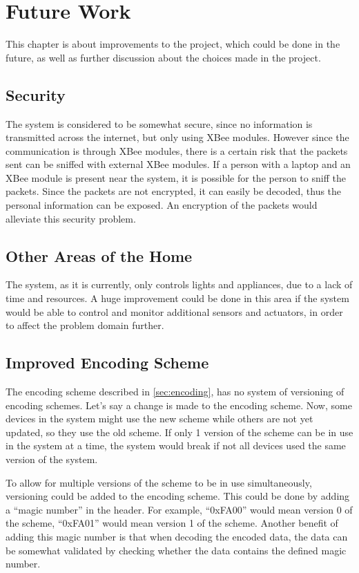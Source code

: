 \chapter{Future Work}
\label{chap:future_work}
This chapter is about improvements to the project, which could be done in the future, as well as further discussion about the choices made in the project.

\section{Security}
The system is considered to be somewhat secure, since no information is transmitted across the internet, but only using XBee modules. However since the communication is through XBee modules, there is a certain risk that the packets sent can be sniffed with external XBee modules. If a person with a laptop and an XBee module is present near the system, it is possible for the person to sniff the packets. Since the packets are not encrypted, it can easily be decoded, thus the personal information can be exposed. An encryption of the packets would alleviate this security problem.

\section{Other Areas of the Home}
The system, as it is currently, only controls lights and appliances, due to a lack of time and resources. A huge improvement could be done in this area if the system would be able to control and monitor additional sensors and actuators, in order to affect the problem domain further.

\section{Improved Encoding Scheme}
The encoding scheme described in \cref{sec:encoding}, has no system of versioning of encoding schemes. Let's say a change is made to the encoding scheme. Now, some devices in the system might use the new scheme while others are not yet updated, so they use the old scheme. If only 1 version of the scheme can be in use in the system at a time, the system would break if not all devices used the same version of the system.

To allow for multiple versions of the scheme to be in use simultaneously, versioning could be added to the encoding scheme. This could be done by adding a \enquote{magic number} in the header. For example, \enquote{0xFA00} would mean version 0 of the scheme, \enquote{0xFA01} would mean version 1 of the scheme. Another benefit of adding this magic number is that when decoding the encoded data, the data can be somewhat validated by checking whether the data contains the defined magic number.

